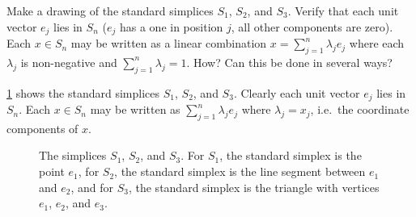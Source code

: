 \begin{exercise}
  Make a drawing of the standard simplices $S_1$, $S_2$, and $S_3$.
  Verify that each unit vector $e_j$ lies in $S_n$ ($e_j$ has a one in position $j$, all other components are zero).
  Each $x \in S_n$ may be written as a linear combination $x = \sum_{j=1}^{n} \lambda_j e_j$ where each $\lambda_j$ is non-negative and $\sum_{j = 1}^{n} \lambda_j = 1$.
  How?
  Can this be done in several ways?
\end{exercise}

\begin{solution}

  \cref{fig:simplices} shows the standard simplices $S_1$, $S_2$, and $S_3$.
  Clearly each unit vector $e_j$ lies in $S_n$.
  Each $x \in S_n$ may be written as $\sum_{j=1}^{n} \lambda_j e_j$ where $\lambda_j = x_j$, i.e.\ the coordinate components of $x$.

  \begin{figure}[htbp]
    \centering

    \resizebox{0.9\textwidth}{!}{
      
    }
    \caption{
      The simplices $S_1$, $S_2$, and $S_3$.
      For $S_1$, the standard simplex is the point $e_1$,
      for $S_2$, the standard simplex is the line segment between $e_1$ and $e_2$,
      and for $S_3$, the standard simplex is the triangle with vertices $e_1$, $e_2$, and $e_3$.\label{fig:simplices}
    }
  \end{figure}
\end{solution}